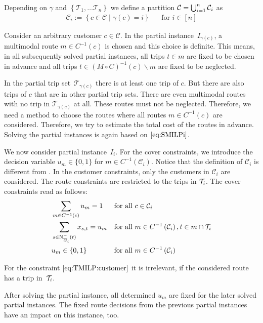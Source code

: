 Depending on $\gamma$ and $\left\{\mathcal{T}_1,\dots\mathcal{T}_n\right\}$ we define a partition ${\mathcal{C}=\bigcup_{i=1}^n \mathcal{C}_i}$ as
\begin{align*}
	\mathcal{C}_i := \left\{c\in\mathcal{C}\mid \gamma(c)=i\right\} && \text{for } i\in[n]
\end{align*}

Consider an arbitrary customer $c\in\mathcal{C}$. In the partial instance~$I_{\gamma(c)}$, a multimodal route $m\in C^{-1}(c)$ is chosen and this choice is definite. This means, in all subsequently solved partial instances, all trips ${t\in m}$ are fixed to be chosen in advance and all trips ${t\in(M\circ C)^{-1}(c)\backslash m}$ are fixed to be neglected.

In the partial trip set~$\mathcal{T}_{\gamma(c)}$ there is at least one trip of $c$. But there are also trips of $c$ that are in other partial trip sets. There are even multimodal routes with no trip in $\mathcal{T}_{\gamma(c)}$ at all. These routes must not be neglected. Therefore, we need a method to choose the routes where all routes ${m\in C^{-1}(c)}$ are considered. Therefore, we try to estimate the total cost of the routes in advance. Solving the partial instances is again based on $\eqref{eq:SMILPi}$.

We now consider partial instance~$I_i$. For the cover constraints, we introduce the decision variable ${u_m\in\{0,1\}}$ for ${m\in C^{-1}\left(\mathcal{C}_i\right)}$.  Notice that the definition of $\mathcal{C}_i$ is different from . In the customer constraints, only the customers in $\mathcal{C}_i$ are considered. The route constraints are restricted to the trips in $\mathcal{T}_i$. The cover constraints read as follows:
\begin{align}
	& \sum_{m\in C^{-1}(c)} u_m = 1 && \text{for all } c\in\mathcal{C}_i \label{eq:TMILP:customer} \\
	& \sum_{s\in\operatorname{N}_{\overline{G}_i}^-(t)} x_{s,t} = u_m && \text{for all } m\in C^{-1}\left(\mathcal{C}_i\right), t\in m\cap\mathcal{T}_i \label{eq:TMILP:route} \\
	& u_m\in\{0,1\} && \text{for all } m\in C^{-1}\left(\mathcal{C}_i\right) \label{eq:TMILP:um}
\end{align}

For the constraint $\eqref{eq:TMILP:customer}$ it is irrelevant, if the considered route has a trip in~$\mathcal{T}_i$.

After solving the partial instance, all determined $u_m$ are fixed for the later solved partial instances. The fixed route decisions from the previous partial instances have an impact on this instance, too. 


